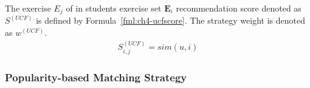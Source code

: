 The exercise \(E_j\) of in students exercise set \(\mathbf{E}_i\) recommendation score denoted as \(S^{(UCF)}\) is defined by Formula~\ref{fml:ch4-ucfscore}. The strategy weight is denoted as \(w^{(UCF)}\).
\begin{align}\label{fml:ch4-ucfscore}
  S^{(UCF)}_{i,j} = sim(u,i)
\end{align}


\subsubsection{Popularity-based Matching Strategy}



